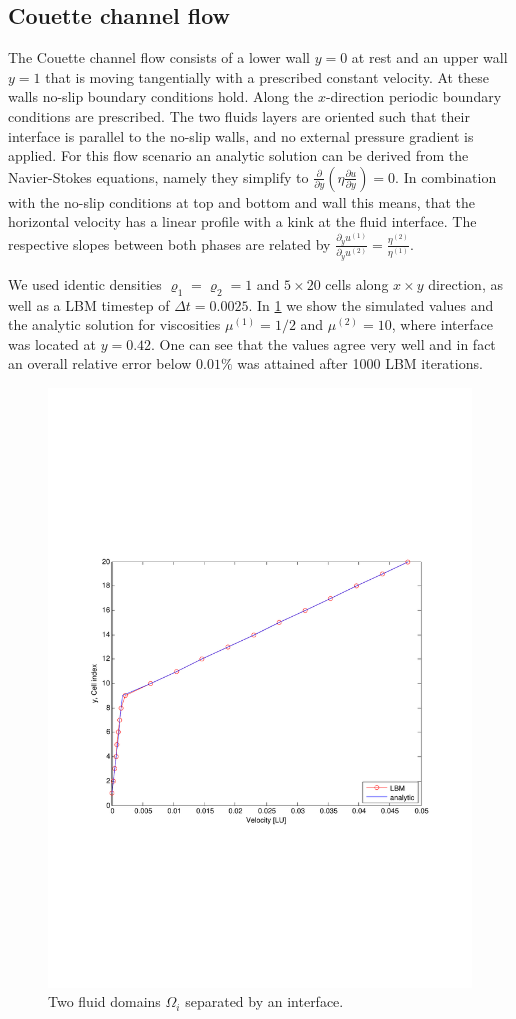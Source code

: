 \documentclass[final,leqno,onefignum,onetabnum]{siamltexmm}
\begin{document}
\subsection{Couette channel flow}
The Couette channel flow consists of a lower wall $y=0$ at rest and an upper wall $y=1$ that is moving tangentially with a prescribed constant velocity. At these walls no-slip boundary conditions hold. Along the $x$-direction periodic boundary conditions are prescribed. The two fluids layers are oriented such that their interface is parallel to the no-slip walls, and no external pressure gradient is applied.
For this flow scenario an analytic solution can be derived from the Navier-Stokes equations, namely they simplify to $\frac{\partial }{\partial y}\left( \eta\frac{\partial u}{\partial y}\right) =0$. In combination with the no-slip conditions at top and bottom and wall this means, that the horizontal velocity has a linear profile with a kink at the fluid interface. The respective slopes between both phases are related by $\frac{\partial_y u^{(1)}}{\partial_y u^{(2)}} = \frac{\eta^{(2)}}{\eta^{(1)}}$.

We used identic densities $\varrho_1 = \varrho_2 = 1$ and $5 \times 20$ cells along $x \times y$ direction, as well as a LBM timestep of $\Delta t=0.0025$. In \cref{couette1} we show the simulated values and the analytic solution for viscosities $\mu^{(1)} = 1/2$ and $\mu^{(2)} = 10$, where interface was located at $y=0.42$. One can see that the values agree very well and in fact an overall relative error below $0.01\%$ was attained after 1000 LBM iterations.
\begin{figure}[h!]
	\flushright
	\includegraphics[trim = 0mm 8cm 0mm 8cm, clip, width=.7\textwidth, natwidth=595,natheight=842]{couette1.pdf}
	\caption{Two fluid domains $\Omega_i$ separated by an interface.}
	\label{couette1}
\end{figure}
\end{document}

